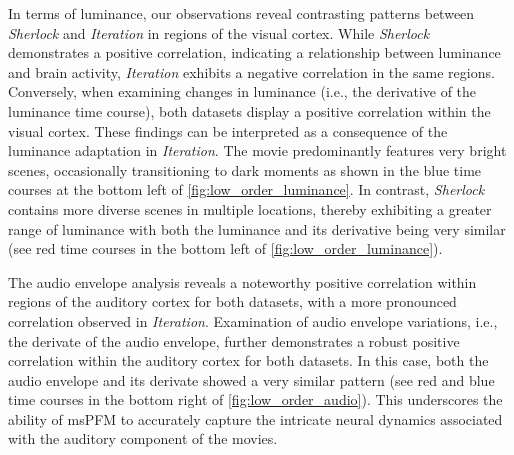 In terms of luminance, our observations reveal contrasting patterns between
\textit{Sherlock} and \textit{Iteration} in regions of the visual cortex. While
\textit{Sherlock} demonstrates a positive correlation, indicating a relationship
between luminance and brain activity, \textit{Iteration} exhibits a negative
correlation in the same regions. Conversely, when examining changes in luminance
(i.e., the derivative of the luminance time course), both datasets display a
positive correlation within the visual cortex. These findings can be interpreted
as a consequence of the luminance adaptation in \textit{Iteration}. The movie
predominantly features very bright scenes, occasionally transitioning to dark
moments as shown in the blue time courses at the bottom left of
\cref{fig:low_order_luminance}. In contrast, \textit{Sherlock} contains more
diverse scenes in multiple locations, thereby exhibiting a greater range of
luminance with both the luminance and its derivative being very similar (see red
time courses in the bottom left of \cref{fig:low_order_luminance}).

The audio envelope analysis reveals a noteworthy positive correlation within
regions of the auditory cortex for both datasets, with a more pronounced
correlation observed in \textit{Iteration}. Examination of audio envelope
variations, i.e., the derivate of the audio envelope, further demonstrates a
robust positive correlation within the auditory cortex for both datasets. In
this case, both the audio envelope and its derivate showed a very similar
pattern (see red and blue time courses in the bottom right of
\cref{fig:low_order_audio}). This underscores the ability of msPFM to accurately
capture the intricate neural dynamics associated with the auditory component of
the movies.

